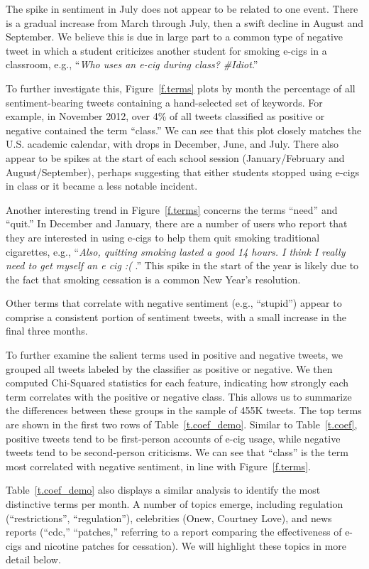 \documentclass{sig-alternate}
\begin{document}
The spike in sentiment in July does not appear to be related to one event. There is a gradual increase from March through July, then a swift decline in August and September. We believe this is due in large part to a common type of negative tweet in which a student criticizes another student for smoking e-cigs in a classroom, e.g.,  ``{\it Who uses an e-cig during class? \#Idiot}.''

To further investigate this, Figure~\ref{f.terms} plots by month the percentage of all sentiment-bearing tweets containing a hand-selected set of keywords. For example, in November 2012, over 4\% of all tweets classified as positive or negative contained the term ``class.'' We can see that this plot closely matches the U.S. academic calendar, with drops in December, June, and July. There also appear to be spikes at the start of each school session (January/February and August/September), perhaps suggesting that either students stopped using e-cigs in class or it became a less notable incident.

Another interesting trend in Figure~\ref{f.terms} concerns the terms ``need''
and ``quit.'' In December and January, there are a number of users who report
that they are interested in using e-cigs to help them quit smoking traditional
cigarettes, e.g., ``{\sl Also, quitting smoking lasted a good 14 hours. I
  think I really need to get myself an e cig :( }.'' This spike in the start
of the year is likely due to the fact that smoking cessation is a common New
Year's resolution.

Other terms that correlate with negative sentiment (e.g.,  ``stupid'')
appear to comprise a consistent portion of sentiment tweets, with a small
increase in the final three months.

To further examine the salient terms used in positive and negative tweets, we grouped all tweets labeled by the classifier as positive or negative. We then computed Chi-Squared statistics for each feature, indicating how strongly each term correlates with the positive or negative class. This allows us to summarize the differences between these groups in the sample of 455K tweets. The top terms are shown in the first two rows of Table~\ref{t.coef_demo}. Similar to Table~\ref{t.coef}, positive tweets tend to be first-person accounts of e-cig usage, while negative tweets tend to be second-person criticisms. We can see that ``class'' is the term most correlated with negative sentiment, in line with Figure~\ref{f.terms}. 

Table~\ref{t.coef_demo} also displays a similar analysis to identify the most
distinctive terms per month. A number of topics emerge, including regulation
(``restrictions'', ``regulation''), celebrities (Onew, Courtney Love), and
news reports (``cdc,'' ``patches,'' referring to a report comparing the
effectiveness of e-cigs and nicotine patches for cessation). We will highlight these topics in more detail below.
\end{document}
